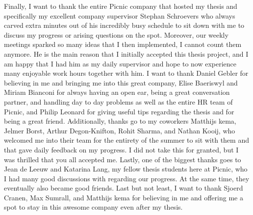 Finally, I want to thank the entire Picnic company that hosted my thesis and
specifically my excellent company supervisor Stephan Schroevers who always carved extra minutes
out of his incredibly busy schedule to sit down with me to discuss my progress
or arising questions on the spot. Moreover, our weekly meetings sparked so many
ideas that I then implemented, I cannot count them anymore. He is the main
reason that I initially accepted this thesis project, and I am happy that I had
him as my daily supervisor and hope to now experience many enjoyable work hours
together with him. I want to thank Daniel Gebler for believing in me and
bringing me into this great company, Elise Baeriswyl and Miriam Bianconi
for always having an open ear, being a great conversation partner,
and handling day to day problems as well as the entire HR team of Picnic,
and Philip Leonard for giving useful tips regarding the thesis and for being
a great friend.
Additionally, thanks go to my coworkers Matthijs \IJ{}kema, Jelmer Borst,
Arthur Degon-Knifton, Rohit Sharma, and Nathan Kooij, who welcomed me into their
team for the entirety of the summer to sit with them and that gave daily
feedback on my progress. I did not take this for granted, but I was thrilled
that you all accepted me.
Lastly, one of the biggest thanks goes to Jean de Leeuw and Katarina Lang,
my fellow thesis students here at Picnic, who I had many good discussions with
regarding our progress. At the same time, they eventually also became good
friends.
Last but not least, I want to thank Sjoerd Cranen, Max Sumrall,
and Matthijs \IJ{}kema for believing in me and offering me a spot to stay in this
awesome company even after my thesis.

\vfill

\cleardoublepage

\raggedbottom
